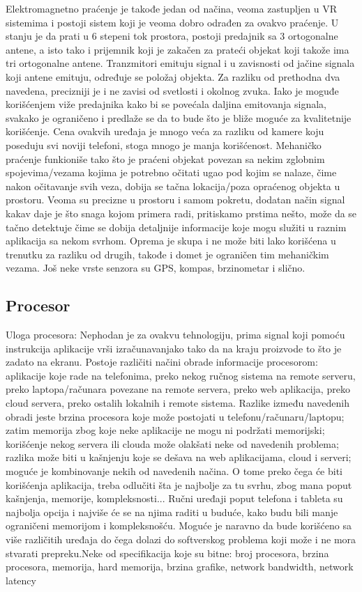 \documentclass[a4paper]{article}
\begin{document}
	Elektromagnetno praćenje je takođe jedan od načina, veoma zastupljen u VR sistemima i postoji sistem koji je veoma dobro odrađen za ovakvo praćenje. U stanju je da prati u 6 stepeni tok prostora, postoji predajnik sa 3 ortogonalne antene, a isto tako i prijemnik koji je zakačen za prateći objekat koji takože ima tri ortogonalne antene. Tranzmitori emituju signal i u zavisnosti od jačine signala koji antene emituju, određuje se položaj objekta. Za razliku od prethodna dva navedena, precizniji je i ne zavisi od svetlosti i okolnog zvuka. Iako je moguđe korišćenjem viže predajnika kako bi se povećala daljina emitovanja signala, svakako je ograničeno i predlaže se da to bude što je bliže moguće za kvalitetnije korišćenje. Cena ovakvih uređaja je mnogo veća za razliku od kamere koju poseduju svi noviji telefoni, stoga mnogo je manja korišćenost.
	Mehaničko praćenje funkioniše tako što je praćeni objekat povezan sa nekim zglobnim spojevima/vezama kojima je potrebno očitati ugao pod kojim se nalaze, čime nakon očitavanje svih veza, dobija se tačna lokacija/poza opraćenog objekta u prostoru. Veoma su precizne u prostoru i samom pokretu, dodatan način signal kakav daje je što snaga kojom primera radi, pritiskamo prstima nešto, može da se tačno detektuje čime se dobija detaljnije informacije koje mogu služiti u raznim aplikacija sa nekom svrhom. Oprema je skupa i ne može biti lako korišćena u trenutku za razliku od drugih, takođe i domet je ograničen tim mehaničkim vezama. Još neke vrste senzora su GPS, kompas, brzinometar i slično.
	\subsection{Procesor}
    \label{sec:Procesor}
    Uloga procesora: Nephodan je za ovakvu tehnologiju, prima signal koji pomoću instrukcija aplikacije vrši izračunavanjako tako da na kraju proizvode to što je zadato na ekranu. Postoje različiti načini obrade informacije procesorom: aplikacije koje rade na telefonima, preko nekog ručnog sistema na remote serveru, preko laptopa/računara povezane na remote servera, preko web aplikacija, preko cloud servera, preko ostalih lokalnih i remote sistema.
	Razlike između navedenih obradi jeste brzina procesora koje može postojati u telefonu/računaru/laptopu; zatim memorija zbog koje neke aplikacije ne mogu ni podržati memorijski; korišćenje nekog servera ili clouda može olakšati neke od navedenih problema; razlika može biti u kašnjenju koje se dešava na web aplikacijama, cloud i serveri; moguće je kombinovanje nekih od navedenih načina. 
	O tome preko čega će biti korišćenja aplikacija, treba odlučiti šta je najbolje za tu svrhu, zbog mana poput kašnjenja, memorije, kompleksnosti... Ručni uređaji poput telefona i tableta su najbolja opcija i najviše će se na njima raditi u buduće, kako budu bili manje ograničeni memorijom i kompleksnošću. Moguće je naravno da bude korišćeno sa više različitih uređaja do čega dolazi do softverskog problema koji može i ne mora stvarati prepreku.Neke od specifikacija koje su bitne: broj procesora, brzina procesora, memorija, hard memorija, brzina grafike, network bandwidth, network latency
\end{document}
